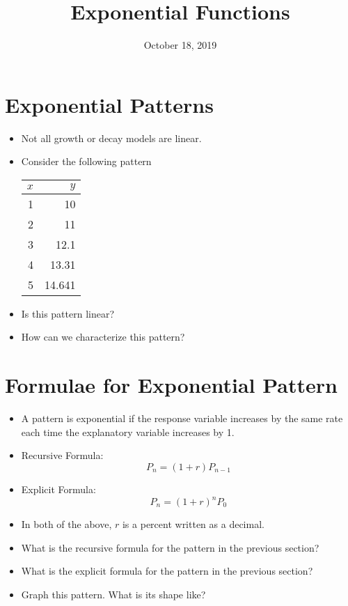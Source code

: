 \documentclass{article}
\title{Exponential Functions}
\date{October 18, 2019}
\begin{document}
\maketitle

\section{Exponential Patterns}
\begin{itemize} 
    \item Not all growth or decay models are linear.
    \item Consider the following pattern

	\begin{tabular}{|r|r|}
		\hline
		$x$ & $y$ \\
		\hline
		1 & 10\\
		2 & 11\\
		3 & 12.1\\
        4 & 13.31\\
        5 & 14.641\\
		\hline
	\end{tabular}

    \item Is this pattern linear?
    \item How can we characterize this pattern?
\end{itemize}

\section{Formulae for Exponential Pattern}
\begin{itemize}
    \item A pattern is exponential if the response variable increases
        by the same rate each time the explanatory variable increases
        by 1.
    \item Recursive Formula:
    \[
        P_n = (1+r)P_{n-1}
    \]
    \item Explicit Formula:
    \[
        P_n = (1+r)^nP_0
    \]
    \item In both of the above, $r$ is a percent written as a decimal.
    \item What is the recursive formula for the pattern in the
        previous section?
    \item What is the explicit formula for the pattern in the previous
        section?
    \item Graph this pattern.  What is its shape like?
\end{itemize}
\end{document}

